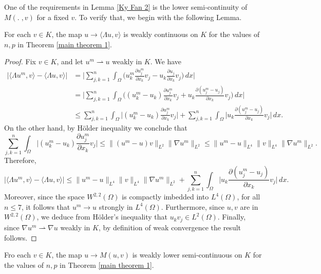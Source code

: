 \documentclass[reqno]{amsart}
\begin{document}
One of the requirements in Lemma \ref{Ky Fan 2} is  the lower semi-continuity of
$M(.\;,v)$ for a fixed $v$. To verify  that, we begin with the following Lemma.

\begin{lemma}\label{lem SC 1}
For each \( v\in K\), the map   \( u\to\langle \Lambda u, v\rangle  \) is weakly
continuous on \(K\) for the values of  \( n,p \) in Theorem \ref{main theorem 1}.
\end{lemma}

\begin{proof}
Fix \( v \in  K\), and let  \(u^m\rightharpoonup u\) weakly in \(K\). We have
\begin{align*}
\big| \langle \Lambda u^m, v\rangle -  \langle \Lambda u, v\rangle  \big|
&=\Big|\sum_{j,k=1}^n\int_\Omega\big(u_k^m\frac{\partial u_j^m}{\partial x_k}v_j
 -u_k\frac{\partial u_j}{\partial x_k}v_j\big) \,dx\Big| \\
&=\Big|\sum_{j,k=1}^n\int_\Omega\big( (u_k^m-u_k)\frac{\partial u_j^m}{\partial x_k}v_j
 +u_k\frac{\partial (u_j^m-u_j)}{\partial x_k}v_j\big) \,dx\Big| \\
&\leq \sum_{j,k=1}^n\int_\Omega\Big| (u_k^m-u_k)\frac{\partial u_j^m}{\partial x_k}v_j
 \Big|
+\sum_{j,k=1}^n\int_\Omega \Big| u_k\frac{\partial (u_j^m-u_j)}{\partial x_k}v_j\Big|
\,dx.
\end{align*}
On the other hand, by H\"{o}lder inequality we conclude that
\[
\sum_{j,k=1}^n\int_\Omega\Big| (u_k^m-u_k)\frac{\partial u_j^m}{\partial x_k}v_j\Big|
    \leq \rVert (u^m-u)v \rVert_{L^2}\rVert \nabla u^m \rVert_{L^2}
    \leq \rVert u^m-u \rVert_{L^4}\rVert v \rVert_{L^4} \rVert \nabla u^m \rVert_{L^2}.
\]
Therefore,
\[
\big| \langle\Lambda u^m, v\rangle -  \langle\Lambda u, v\rangle \big|
\leq \rVert u^m-u \rVert_{L^4}\rVert v \rVert_{L^4} \rVert \nabla u^m \rVert_{L^2}
 +\sum_{j,k=1}^n\int_\Omega \Big| u_k\frac{\partial (u_j^m-u_j)}{\partial x_k}v_j\Big|
 \,dx.
\]
Moreover, since the space \(W^{2,2}(\Omega)\) is compactly imbedded into
\(L^4(\Omega)\), for all \(n\leq 7\),  it follows that \(u^m\to u\) strongly
in \(L^4(\Omega)\).
Furthermore, since $u,v$ are in \(W^{2,2}(\Omega)\), we deduce
from H\"{o}lder's inequality that \(u_kv_j\in L^2(\Omega)\).
Finally,  since  \(\nabla u^m\rightharpoonup \nabla u\) weakly in \(K\),  by
definition of weak convergence  the result follows.
\end{proof}

\begin{lemma} \label{WLSC}
Fro each  \( v\in K\), the map \(u\to M(u, v) \) is weakly lower semi-continuous on
\(K\) for the values of  \( n,p \) in Theorem \ref{main theorem 1}.
\end{lemma}
\end{document}
